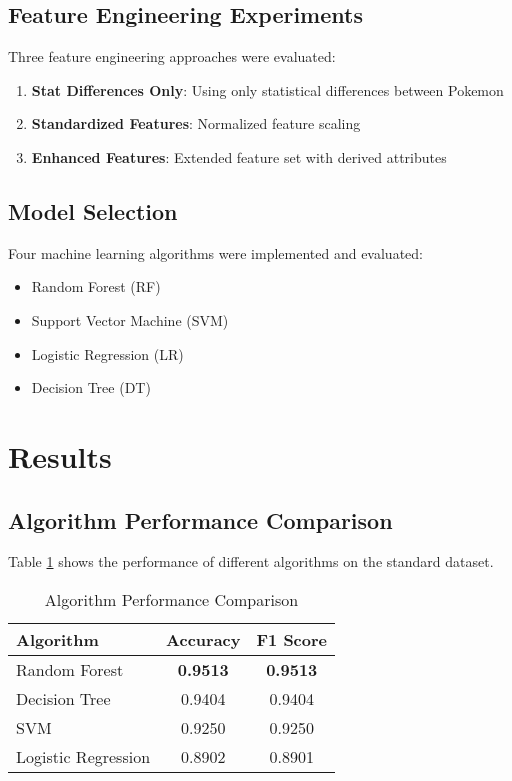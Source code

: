 \documentclass[12pt,a4paper]{article}
\begin{document}
\subsection{Feature Engineering Experiments}
Three feature engineering approaches were evaluated:
\begin{enumerate}
    \item \textbf{Stat Differences Only}: Using only statistical differences between Pokemon
    \item \textbf{Standardized Features}: Normalized feature scaling
    \item \textbf{Enhanced Features}: Extended feature set with derived attributes
\end{enumerate}

\subsection{Model Selection}
Four machine learning algorithms were implemented and evaluated:
\begin{itemize}
    \item Random Forest (RF)
    \item Support Vector Machine (SVM)
    \item Logistic Regression (LR)
    \item Decision Tree (DT)
\end{itemize}

\section{Results}

\subsection{Algorithm Performance Comparison}

Table \ref{tab:algorithm_comparison} shows the performance of different algorithms on the standard dataset.

\begin{table}[H]
\centering
\caption{Algorithm Performance Comparison}
\label{tab:algorithm_comparison}
\begin{tabular}{lcc}
\toprule
\textbf{Algorithm} & \textbf{Accuracy} & \textbf{F1 Score} \\
\midrule
Random Forest & \textbf{0.9513} & \textbf{0.9513} \\
Decision Tree & 0.9404 & 0.9404 \\
SVM & 0.9250 & 0.9250 \\
Logistic Regression & 0.8902 & 0.8901 \\
\bottomrule
\end{tabular}
\end{table}
\end{document}
